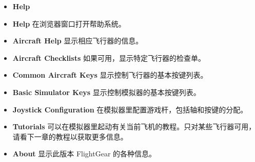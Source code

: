 \ifchinese
\begin{itemize}
 \item \textbf{Help}
 \item \textbf{Help} 在浏览器窗口打开帮助系统。
  \item \textbf{Aircraft Help} 显示相应飞行器的信息。
  \item \textbf{Aircraft Checklists} 如果可用，显示特定飞行器的检查单。
   \item \textbf{Common Aircraft Keys} 显示控制飞行器的基本按键列表。
    \item \textbf{Basic Simulator Keys} 显示控制模拟器的基本按键列表。
   \item \textbf{Joystick Configuration} 在模拟器里配置游戏杆，包括轴和按键的分配。
   \item \textbf{Tutorials} 可以在模拟器里起动有关当前飞机的教程。只对某些飞行器可用，请看下一章的教程以获取更多信息。
   \item \textbf{About} 显示此版本 FlightGear 的各种信息。
 \end{itemize}
\fi

